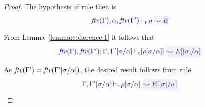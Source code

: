 {\centering
{}}

\begin{proof}
  The hypothesis of rule  then is
\begin{equation*}
  \dres{\ftv{\tenv},\alpha,\ftv{\tenv'}}{\rulet}{E}
\end{equation*}

  From Lemma~\ref{lemma:coherence:1} it follows that
\begin{equation*}
  \drres{\ftv{\tenv},\ftv{\tenv'}}{\tenv,\tenv'[\suty/\alpha]}{\rulet[\suty/\alpha]}{E[|\suty|/\alpha]}
\end{equation*}

  As ${\it ftv }(\Gamma') = {\it ftv }(\Gamma'[\sigma/\alpha])$, the desired result follows from rule
\begin{equation*}
 \dres{\tenv,\tenv'[\suty/\alpha]}{\rulet[\suty/\alpha]}{E[|\suty|/\alpha]}
\end{equation*}
\end{proof}

